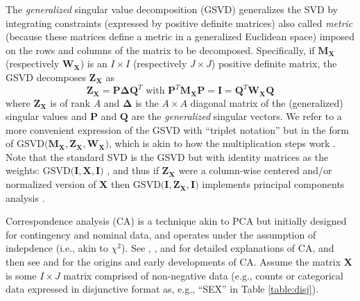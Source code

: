 \documentclass[12pt]{article}
\begin{document}
The \emph{generalized} singular value decomposition (GSVD) generalizes
the SVD by integrating constraints (expressed by positive definite
matrices) also called \emph{metric} (because these matrices define a
metric in a generalized Euclidean space) imposed on the rows and columns
of the matrix to be decomposed. Specifically, if
\({\mathbf M}_{{\mathbf X}}\) (respectively
\({\mathbf W}_{{\mathbf X}}\)) is an \(I\times I\) (respectively
\(J\times J\)) positive definite matrix, the GSVD decomposes
\({\mathbf Z}_{\mathbf X}\) as \begin{equation}\label{eq:gsvd}
{\mathbf Z}_{\mathbf X} = {\mathbf P} 
{\boldsymbol \Delta} {\mathbf Q}^{T} 
\textrm{ with }
{\mathbf P}^{T}{\mathbf M}_{{\mathbf X}}{\mathbf P} = {\mathbf I} = {\mathbf Q}^{T}{\mathbf W}_{{\mathbf X}}{\mathbf Q}
\end{equation} where \({\mathbf Z}_{\mathbf X}\) is of rank \(A\) and
\({\boldsymbol \Delta}\) is the \(A \times A\) diagonal matrix of the
(generalized) singular values and \({\mathbf P}\) and \({\mathbf Q}\)
are the \emph{generalized} singular vectors. We refer to a more
convenient expression of the GSVD with ``triplet notation''
\citep[\citet{holmes_multivariate_2008},\citet{dray2014}]{escoufier2006}
but in the form of
\(\mathrm{GSVD(} {\mathbf M}_{{\mathbf X}}, {\mathbf Z}_{\mathbf X}, {\mathbf W}_{{\mathbf X}} \mathrm{)}\),
which is akin to how the multiplication steps work \citep[see
also][]{beaton2018generalization}. Note that the standard SVD is the
GSVD but with identity matrices as the weights:
\(\mathrm{GSVD(} {\mathbf I}, {\mathbf X}, {\mathbf I} \mathrm{)}\)
\citep[see also][]{takane_relationships_2003}, and thus if
\({\mathbf Z}_{\mathbf X}\) were a column-wise centered and/or
normalized version of \({\mathbf X}\) then
\(\mathrm{GSVD(} {\mathbf I}, {\mathbf Z}_{\mathbf X}, {\mathbf I} \mathrm{)}\)
implements principal components analysis
\citep[PCA,][\citet{abdi2007svd}]{saporta2011}.

Correspondence analysis (CA) is a technique akin to PCA but initially
designed for contingency and nominal data, and operates under the
assumption of indepdence (i.e., akin to \(\chi^2\)). See
\citet{greenacre_theory_1984}, \citet{greenacre_correspondence_2010-1},
and \citet{lebart_multivariate_1984} for detailed explanations of CA,
and then see \citet{escofier-cordier_analyse_1965} and
\citet{benzecri_analyse_1973} for the origins and early developments of
CA. Assume the matrix \({\mathbf X}\) is some \(I \times J\) matrix
comprised of non-negative data (e.g., counts or categorical data
expressed in disjunctive format as, e.g., ``SEX'' in Table
\ref{table:disj}).
\end{document}
